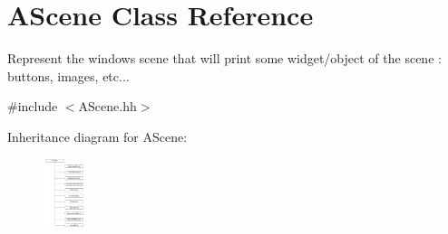 \hypertarget{classAScene}{}\section{A\+Scene Class Reference}
\label{classAScene}


Represent the window\textquotesingle{}s scene that will print some widget/object of the scene \+: buttons, images, etc...  




{\ttfamily \#include $<$A\+Scene.\+hh$>$}

Inheritance diagram for A\+Scene\+:\begin{figure}[H]
\begin{center}
\leavevmode
\includegraphics[height=2.000000cm]{classAScene}
\end{center}
\end{figure}
